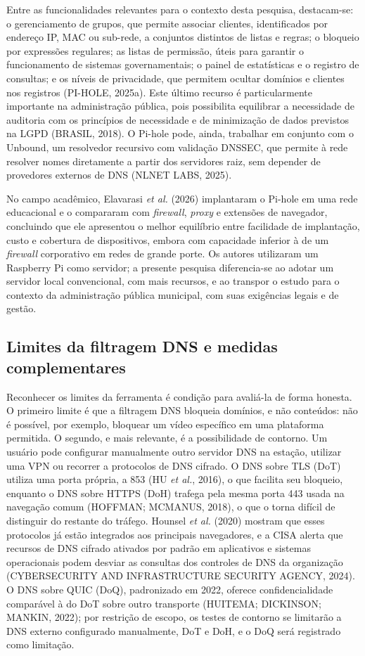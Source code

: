 \documentclass[12pt,a4paper]{article}
\begin{document}
Entre as funcionalidades relevantes para o contexto desta pesquisa, destacam-se: o gerenciamento de grupos, que permite associar clientes, identificados por endereço IP, MAC ou sub-rede, a conjuntos distintos de listas e regras; o bloqueio por expressões regulares; as listas de permissão, úteis para garantir o funcionamento de sistemas governamentais; o painel de estatísticas e o registro de consultas; e os níveis de privacidade, que permitem ocultar domínios e clientes nos registros (PI-HOLE, 2025a). Este último recurso é particularmente importante na administração pública, pois possibilita equilibrar a necessidade de auditoria com os princípios de necessidade e de minimização de dados previstos na LGPD (BRASIL, 2018). O Pi-hole pode, ainda, trabalhar em conjunto com o Unbound, um resolvedor recursivo com validação DNSSEC, que permite à rede resolver nomes diretamente a partir dos servidores raiz, sem depender de provedores externos de DNS (NLNET LABS, 2025).

No campo acadêmico, Elavarasi \textit{et al.} (2026) implantaram o Pi-hole em uma rede educacional e o compararam com \textit{firewall}, \textit{proxy} e extensões de navegador, concluindo que ele apresentou o melhor equilíbrio entre facilidade de implantação, custo e cobertura de dispositivos, embora com capacidade inferior à de um \textit{firewall} corporativo em redes de grande porte. Os autores utilizaram um Raspberry Pi como servidor; a presente pesquisa diferencia-se ao adotar um servidor local convencional, com mais recursos, e ao transpor o estudo para o contexto da administração pública municipal, com suas exigências legais e de gestão.

\subsection{Limites da filtragem DNS e medidas complementares}
Reconhecer os limites da ferramenta é condição para avaliá-la de forma honesta. O primeiro limite é que a filtragem DNS bloqueia domínios, e não conteúdos: não é possível, por exemplo, bloquear um vídeo específico em uma plataforma permitida. O segundo, e mais relevante, é a possibilidade de contorno. Um usuário pode configurar manualmente outro servidor DNS na estação, utilizar uma VPN ou recorrer a protocolos de DNS cifrado. O DNS sobre TLS (DoT) utiliza uma porta própria, a 853 (HU \textit{et al.}, 2016), o que facilita seu bloqueio, enquanto o DNS sobre HTTPS (DoH) trafega pela mesma porta 443 usada na navegação comum (HOFFMAN; MCMANUS, 2018), o que o torna difícil de distinguir do restante do tráfego. Hounsel \textit{et al.} (2020) mostram que esses protocolos já estão integrados aos principais navegadores, e a CISA alerta que recursos de DNS cifrado ativados por padrão em aplicativos e sistemas operacionais podem desviar as consultas dos controles de DNS da organização (CYBERSECURITY AND INFRASTRUCTURE SECURITY AGENCY, 2024). O DNS sobre QUIC (DoQ), padronizado em 2022, oferece confidencialidade comparável à do DoT sobre outro transporte (HUITEMA; DICKINSON; MANKIN, 2022); por restrição de escopo, os testes de contorno se limitarão a DNS externo configurado manualmente, DoT e DoH, e o DoQ será registrado como limitação.
\end{document}
